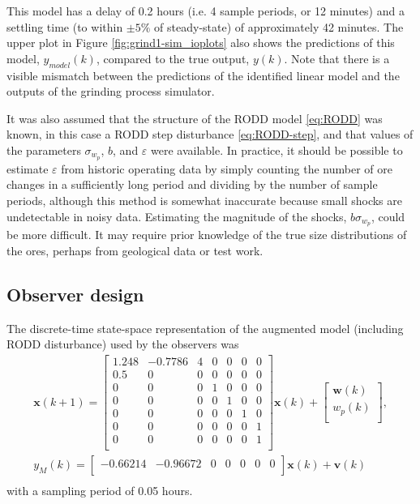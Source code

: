 This model has a delay of 0.2 hours (i.e. 4 sample periods, or 12 minutes) and a settling time (to within $\pm5\%$ of steady-state) of approximately 42 minutes. The upper plot in Figure \ref{fig:grind1-sim_ioplots} also shows the predictions of this model, $y_{model}(k)$, compared to the true output, $y(k)$. Note that there is a visible mismatch between the predictions of the identified linear model and the outputs of the grinding process simulator.

It was also assumed that the structure of the \gls{RODD} model \eqref{eq:RODD} was known, in this case a \gls{RODD} step disturbance \eqref{eq:RODD-step}, and that values of the parameters $\sigma_{w_p}$, $b$, and $\varepsilon$ were available. In practice, it should be possible to estimate $\varepsilon$ from historic operating data by simply counting the number of ore changes in a sufficiently long period and dividing by the number of sample periods, although this method is somewhat inaccurate because small shocks are undetectable in noisy data. Estimating the magnitude of the shocks, $b\sigma_{w_p}$, could be more difficult. It may require prior knowledge of the true size distributions of the ores, perhaps from geological data or test work.

\subsection{Observer design} \label{sec:grind1-obs-design}

The discrete-time state-space representation of the augmented model (including \gls{RODD} disturbance) used by the observers was
\begin{multline} \label{eq:grind1-obs_ss_model}
	\mathbf{x}(k+1) = 
	\begin{bmatrix}
		1.248 & -0.7786 & 4 & 0 & 0 & 0 & 0 \\
		0.5   &  0      & 0 & 0 & 0 & 0 & 0 \\
		0     &  0      & 0 & 1 & 0 & 0 & 0 \\
		0     &  0      & 0 & 0 & 1 & 0 & 0 \\
		0     &  0      & 0 & 0 & 0 & 1 & 0 \\
		0     &  0      & 0 & 0 & 0 & 0 & 1 \\
		0     &  0      & 0 & 0 & 0 & 0 & 1 \\
	\end{bmatrix} \mathbf{x}(k)
	+ \begin{bmatrix}
		\mathbf{w}(k) \\
		w_p(k) \\
	\end{bmatrix}, \\
	y_M(k) = 
	\begin{bmatrix}
		-0.66214 & -0.96672 & 0 & 0 & 0 & 0 & 0 \\
	\end{bmatrix} \mathbf{x}(k) + \mathbf{v}(k) \\
\end{multline}
with a sampling period of 0.05 hours.


